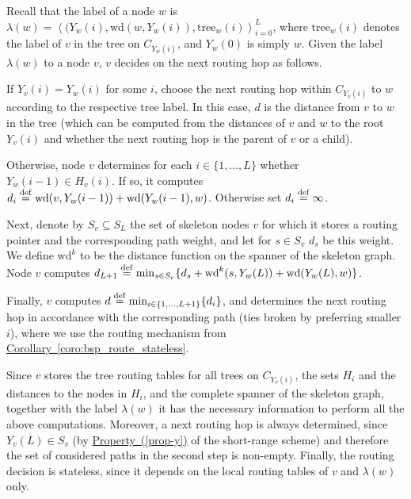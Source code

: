 \documentclass[letterpaper,11pt]{article}
\newcommand{\namedref}[2]{\hyperref[#2]{#1~\ref*{#2}}}
\newcommand{\corollaryref}[1]{\namedref{Corollary}{#1}}
\newcommand{\pprtyref}[1]{\hyperref[#1]{Property~(\ref*{#1})}}
\newcommand{\Seq}[1]{\left\langle #1 \right\rangle}
\newcommand{\DEF}{\ensuremath{\stackrel{\rm def}{=}}}
\newcommand{\Wd}{\mathrm{wd}}
\newcommand{\Lead}{Y}
\begin{document}
Recall that the label of a node $w$ is
$\lambda(w)=\Seq{(\Lead_w(i),\Wd(w,\Lead_w(i)),\textrm{tree}_w(i)}_{i=0}^L$,
where $\textrm{tree}_w(i)$ denotes the label of $v$ in the tree on
$C_{\Lead_w(i)}$, and $\Lead_w(0)$ is simply $w$. Given the label $\lambda(w)$
to a node $v$, $v$ decides on the next routing hop as follows.
\begin{compactitem}
  \item If $\Lead_v(i)=\Lead_w(i)$ for some $i$, choose the next routing hop
  within $C_{\Lead_v(i)}$ to $w$ according to the respective tree label. In this
  case, $d$ is the distance from $v$ to $w$ in the tree (which can be computed
  from the distances of $v$ and $w$ to the root $\Lead_v(i)$ and whether the
  next routing hop is the parent of $v$ or a child).  
  \item Otherwise, node $v$ determines for each $i\in
  \{1,\ldots,L\}$ whether $\Lead_w(i-1)\in H_v(i)$. If so, it computes $d_i\DEF
  \Wd(v,\Lead_w(i-1))+\Wd(\Lead_w(i-1),w)$. Otherwise set $d_i\DEF \infty$.
  \item Next, denote by $S_v\subseteq S_L$ the set of skeleton nodes $v$ for
  which it stores a routing pointer and the corresponding path weight, and let
  for $s\in S_v$ $d_s$ be this weight. We define $\Wd^k$ to be the distance
  function on the spanner of the skeleton graph. Node $v$ computes
  $d_{L+1}\DEF\min_{s\in S_v}\{d_s+\Wd^k(s,\Lead_w(L))+\Wd(\Lead_w(L),w)\}$.
  \item Finally, $v$ computes $d\DEF \min_{i\in \{1,\ldots,L+1\}}\{d_i\}$, and
  determines the next routing hop in accordance with the corresponding path (ties
  broken by preferring smaller $i$), where we use the
  routing mechanism from \corollaryref{coro:bsp_route_stateless}.
\end{compactitem}
Since $v$ stores the tree routing tables for all trees on $C_{\Lead_v(i)}$,
the sets $H_i$ and the distances to the nodes in $H_i$, and
the complete spanner of the skeleton graph, together with the label $\lambda(w)$
it has the necessary information to perform all the above computations. Moreover, a next
routing hop is always determined, since $\Lead_v(L)\in S_v$ (by
\pprtyref{prop-y} of the short-range scheme) and therefore the set of
considered paths in the second step is non-empty. Finally, the routing decision
is stateless, since it depends on the local routing tables of $v$ and
$\lambda(w)$ only.
\end{document}
